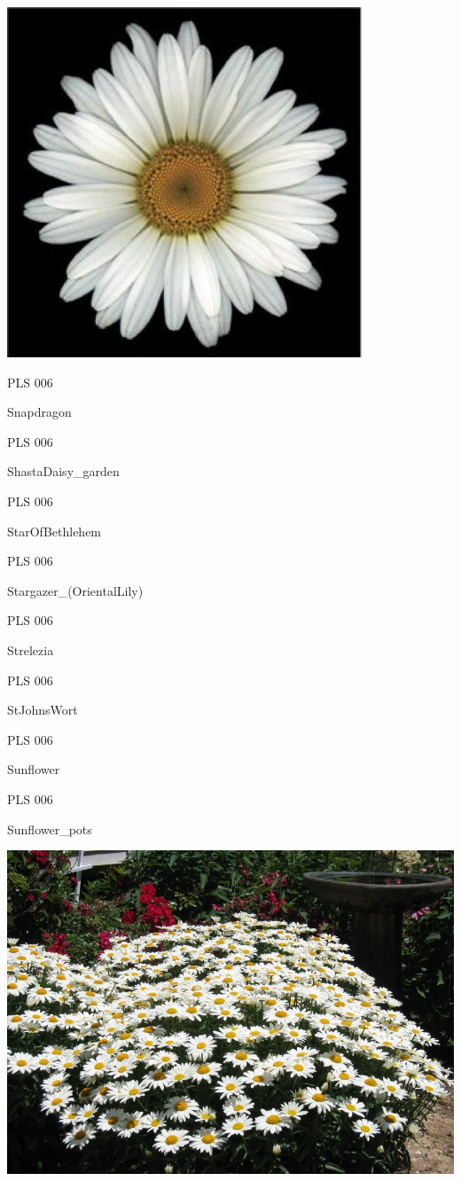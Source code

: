 \documentclass{article}
\begin{document}
\begin{center}
\includegraphics[height=0.925\paperheight]{../ShastaDaisy.jpg}
\end{center}
\newpage

\noindent  PLS 006
\vfill
\centerline{{\huge Snapdragon }}
\vfill
\newpage

\noindent  PLS 006
\vfill
\centerline{{\huge ShastaDaisy\_garden }}
\vfill
\newpage

\noindent  PLS 006
\vfill
\centerline{{\huge StarOfBethlehem }}
\vfill
\newpage

\noindent  PLS 006
\vfill
\centerline{{\huge Stargazer\_(OrientalLily) }}
\vfill
\newpage

\noindent  PLS 006
\vfill
\centerline{{\huge Strelezia }}
\vfill
\newpage

\noindent  PLS 006
\vfill
\centerline{{\huge StJohnsWort }}
\vfill
\newpage

\noindent  PLS 006
\vfill
\centerline{{\huge Sunflower }}
\vfill
\newpage

\noindent  PLS 006
\vfill
\centerline{{\huge Sunflower\_pots }}
\vfill
\newpage

\begin{center}
\includegraphics[height=0.925\paperheight]{../ShastaDaisy_garden.jpg}
\end{center}
\newpage
\end{document}
